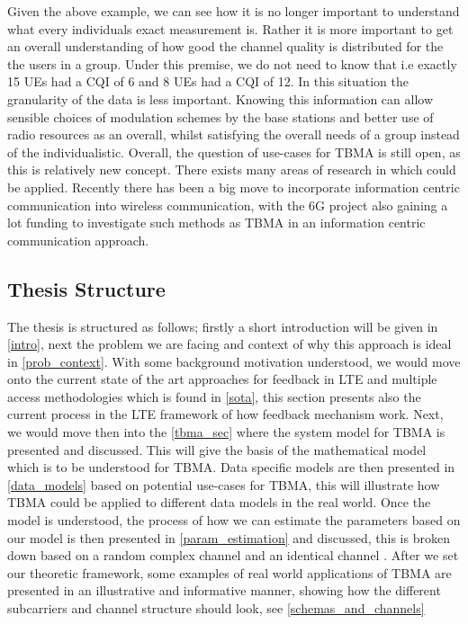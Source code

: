 \documentclass{article}
\begin{document}
Given the above example, we can see how it is no longer important to understand what every individuals exact measurement is. Rather it is more important to get an overall understanding of how good the channel quality is distributed for the the users in a group. Under this premise, we do not need to know that i.e exactly 15 UEs had a CQI of 6 and 8 UEs had a CQI of 12. In this situation the granularity of the data is less important. Knowing this information can allow sensible choices of modulation schemes by the base stations and better use of radio resources as an overall, whilst satisfying the overall needs of a group instead of the individualistic.  Overall, the question of use-cases for TBMA is still open, as this is relatively new concept. There exists many areas of research in which could be applied. Recently there has been a big move to incorporate information centric communication into wireless communication, with the 6G project also gaining a lot funding to investigate such methods as TBMA in an information centric communication approach. 


\subsection{Thesis Structure }
The thesis is structured as follows; firstly a short introduction will be given in \cref{intro}, next the problem we are facing and context of why this approach is ideal in \cref{prob_context}. With some background motivation understood, we would move onto the current state of the art approaches for feedback in LTE and multiple access methodologies which is found in \cref{sota}, this section presents also the current process in the LTE framework of how feedback mechanism work. Next, we would move then into the \cref{tbma_sec} where the system model for TBMA is presented and discussed. This will give the basis of the mathematical model which is to be understood for TBMA. Data specific models are then presented in \cref{data_models} based on potential use-cases for TBMA, this will illustrate how TBMA could be applied to different data models in the real world. Once the model is understood, the process of how we can estimate the parameters based on our model is then presented in \cref{param_estimation} and discussed, this is broken down based on a random complex channel and an identical channel \cite{tbma}. After we set our theoretic framework, some examples of real world applications of TBMA are presented in an illustrative and informative manner, showing how the different subcarriers and channel structure should look, see \cref{schemas_and_channels}
\end{document}
